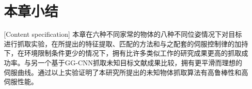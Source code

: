 \documentclass[fontset=fandol,type=bachelor,campus=harbin,bsmainpagenumberline=true]{hithesisbook}
\begin{document}
\newpage
\section{本章小结}[Content specification]
本章在六种不同家常的物体的八种不同位姿情况下对目标进行抓取实验，在所提出的特征提取、匹配的方法和与之配套的伺服控制律的加持下，在环境限制条件更少的情况下，拥有比许多类似工作的研究成果更高的抓取成功率。与另一个基于GG-CNN抓取未知目标文献成果比较，拥有更平滑而理想的伺服曲线。通过以上实验证明了本研究所提出的未知物体抓取算法有高鲁棒性和高伺服性能。
%

\backmatter

%

\end{document}
